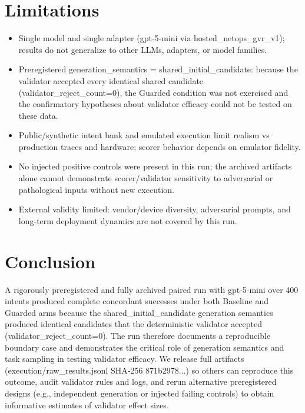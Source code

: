 \documentclass[conference]{IEEEtran}
\begin{document}
\section{Limitations}
\begin{itemize}
\item Single model and single adapter (gpt‑5‑mini via hosted\_netops\_gvr\_v1); results do not generalize to other LLMs, adapters, or model families.
\item Preregistered generation\_semantics = shared\_initial\_candidate: because the validator accepted every identical shared candidate (validator\_reject\_count=0), the Guarded condition was not exercised and the confirmatory hypotheses about validator efficacy could not be tested on these data.
\item Public/synthetic intent bank and emulated execution limit realism vs production traces and hardware; scorer behavior depends on emulator fidelity.
\item No injected positive controls were present in this run; the archived artifacts alone cannot demonstrate scorer/validator sensitivity to adversarial or pathological inputs without new execution.
\item External validity limited: vendor/device diversity, adversarial prompts, and long‑term deployment dynamics are not covered by this run.
\end{itemize}

\section{Conclusion}
A rigorously preregistered and fully archived paired run with gpt‑5‑mini over 400 intents produced complete concordant successes under both Baseline and Guarded arms because the shared\_initial\_candidate generation semantics produced identical candidates that the deterministic validator accepted (validator\_reject\_count=0). The run therefore documents a reproducible boundary case and demonstrates the critical role of generation semantics and task sampling in testing validator efficacy. We release full artifacts (execution/raw\_results.jsonl SHA‑256 871b2978...) so others can reproduce this outcome, audit validator rules and logs, and rerun alternative preregistered designs (e.g., independent generation or injected failing controls) to obtain informative estimates of validator effect sizes.
\end{document}
